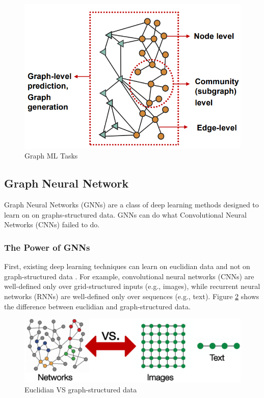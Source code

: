 \begin{figure}
    \centering
    \includegraphics[scale=0.5]{figures/tasks.png}
    \captionsetup{font=large}
    \caption{Graph ML Tasks}
    \label{fig:tasks}
\end{figure}

\subsection{Graph\textcolor{white}{.}Neural Network}
Graph Neural Networks (GNNs) are a class of deep learning methods designed to learn on on graphs-structured data. GNNs can do what Convolutional Neural Networks (CNNs) failed to do.
\subsubsection{The Power of GNNs}
First, existing deep learning techniques can learn on euclidian data and not on graph-structured data \cite{network_euclidian}. For example, convolutional neural networks (CNNs) are well-defined only over grid-structured inputs (e.g., images), while recurrent neural networks (RNNs) are well-defined only over sequences (e.g., text). Figure \ref{fig:network_euclidian} shows the difference between euclidian and graph-structured data.
\begin{figure}
    \centering
    \includegraphics[scale=0.5]{figures/network_euclidian.png}
    \captionsetup{font=large}
    \caption{Euclidian VS graph-structured data}
    \label{fig:network_euclidian}
\end{figure}

